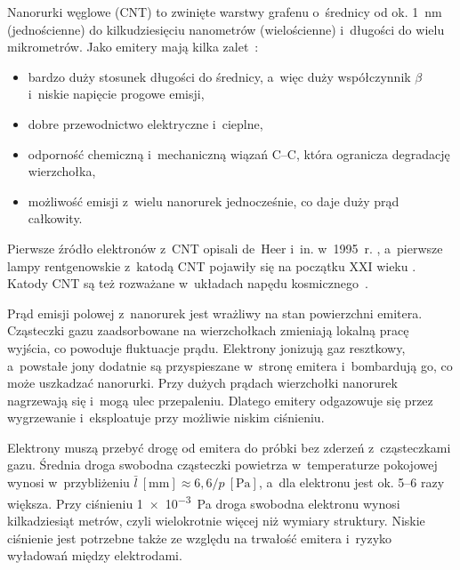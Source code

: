 Nanorurki węglowe (CNT) to zwinięte warstwy grafenu o~średnicy od ok.
\SI{1}{\nano\metre} (jednościenne) do kilkudziesięciu nanometrów
(wielościenne) i~długości do wielu mikrometrów. Jako emitery mają
kilka zalet~\cite{deheer1995cnt,milne2004cnt}:
\begin{itemize}
  \item bardzo duży stosunek długości do średnicy, a~więc duży
        współczynnik $\beta$ i~niskie napięcie progowe emisji,
  \item dobre przewodnictwo elektryczne i~cieplne,
  \item odporność chemiczną i~mechaniczną wiązań C--C, która ogranicza
        degradację wierzchołka,
  \item możliwość emisji z~wielu nanorurek jednocześnie, co daje duży
        prąd całkowity.
\end{itemize}

Pierwsze źródło elektronów z~CNT opisali de~Heer i~in. w~1995~r.
\cite{deheer1995cnt}, a~pierwsze lampy rentgenowskie z~katodą CNT
pojawiły się na początku XXI wieku
\cite{yue2002cntxray,heo2012miniature,parmee2015cntxray}. Katody CNT są
też rozważane w~układach napędu kosmicznego~\cite{huo2020cntspace}.

\begin{zmiana}
Prąd emisji polowej z~nanorurek jest wrażliwy na stan powierzchni
emitera. Cząsteczki gazu zaadsorbowane na wierzchołkach zmieniają
lokalną pracę wyjścia, co powoduje fluktuacje prądu. Elektrony jonizują
gaz resztkowy, a~powstałe jony dodatnie są przyspieszane w~stronę emitera
i~bombardują go, co może uszkadzać nanorurki. Przy dużych prądach
wierzchołki nanorurek nagrzewają się i~mogą ulec przepaleniu. Dlatego
emitery odgazowuje się przez wygrzewanie i~eksploatuje przy możliwie
niskim ciśnieniu.
\end{zmiana}

\begin{przeniesione}
Elektrony muszą przebyć drogę od emitera do próbki bez zderzeń
z~cząsteczkami gazu. Średnia droga swobodna cząsteczki powietrza
w~temperaturze pokojowej wynosi w~przybliżeniu
$\bar l~[\si{\milli\metre}] \approx 6{,}6/p~[\si{\pascal}]$,
a~dla elektronu jest ok. 5--6 razy większa. Przy ciśnieniu
\SI{1e-3}{\pascal} droga swobodna elektronu wynosi kilkadziesiąt metrów,
czyli wielokrotnie więcej niż wymiary struktury. Niskie ciśnienie jest
potrzebne także ze względu na trwałość emitera i~ryzyko wyładowań między
elektrodami.
\end{przeniesione}

